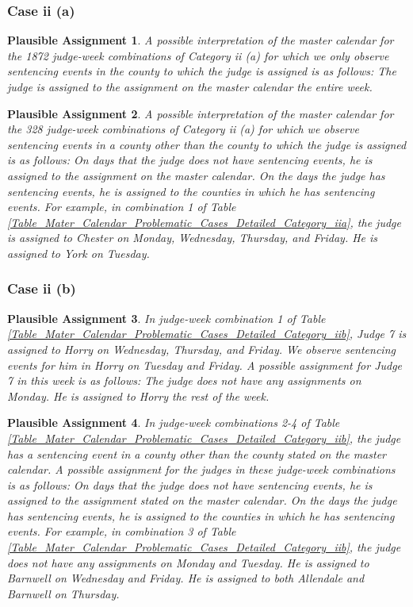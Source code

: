 \documentclass[11pt, oneside]{article}   	%
\theoremstyle{ModifiedStyle}
\newtheorem{plausible_assignment}{Plausible Assignment}
\begin{document}
\subsubsection{Case ii (a)}
%
\begin{plausible_assignment}
	A possible interpretation of the master calendar for the 1872 judge-week combinations of Category ii (a) for which we only observe sentencing events in the county to which the judge is assigned is as follows: The judge is assigned to the assignment on the master calendar the entire week.
\end{plausible_assignment}
%
\begin{plausible_assignment}
	A possible interpretation of the master calendar for the 328 judge-week combinations of Category ii (a) for which we observe sentencing events in a county other than the county to which the judge is assigned is as follows: On days that the judge does not have sentencing events, he is assigned to the assignment on the master calendar. On the days the judge has sentencing events, he is assigned to the counties in which he has sentencing events. For example, in combination 1 of Table \ref{Table_Mater_Calendar_Problematic_Cases_Detailed_Category_iia}, the judge is assigned to Chester on Monday, Wednesday, Thursday, and Friday. He is assigned to York on Tuesday.
\end{plausible_assignment}
%
\subsubsection{Case ii (b)}
\begin{plausible_assignment}
	In judge-week combination 1 of Table \ref{Table_Mater_Calendar_Problematic_Cases_Detailed_Category_iib}, Judge 7 is assigned to Horry on Wednesday, Thursday, and Friday. We observe sentencing events for him in Horry on Tuesday and Friday. A possible assignment for Judge 7 in this week is as follows: The judge does not have any assignments on Monday. He is assigned to Horry the rest of the week.
\end{plausible_assignment}
%
\begin{plausible_assignment}
	In judge-week combinations 2-4 of Table \ref{Table_Mater_Calendar_Problematic_Cases_Detailed_Category_iib}, the judge has a sentencing event in a county other than the county stated on the master calendar. A possible assignment for the judges in these judge-week combinations is as follows: On days that the judge does not have sentencing events, he is assigned to the assignment stated on the master calendar. On the days the judge has sentencing events, he is assigned to the counties in which he has sentencing events. For example, in combination 3 of Table \ref{Table_Mater_Calendar_Problematic_Cases_Detailed_Category_iib}, the judge does not have any assignments on Monday and Tuesday. He is assigned to Barnwell on Wednesday and Friday. He is assigned to both Allendale and Barnwell on Thursday.
\end{plausible_assignment}
%
\end{document}
